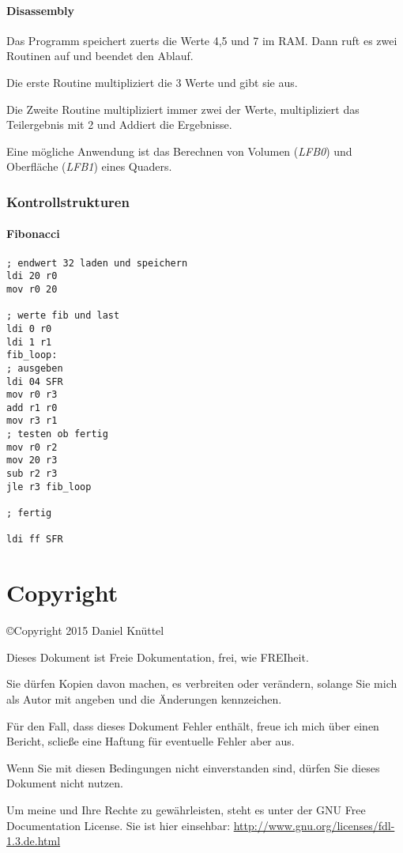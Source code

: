 \documentclass[a4paper,12pt,oneside]{scrreprt}
\begin{document}
\subsection{Disassembly}
\label{sub:disas}

Das Programm speichert zuerts die Werte 4,5 und 7 im RAM.
Dann ruft es zwei Routinen auf und beendet den Ablauf.

Die erste Routine multipliziert die 3 Werte und gibt sie aus.

Die Zweite Routine multipliziert immer zwei der Werte, multipliziert das Teilergebnis mit 2 und Addiert die Ergebnisse.

Eine mögliche Anwendung ist das Berechnen von Volumen (\textit{LFB0}) und Oberfläche (\textit{LFB1}) eines Quaders.

\section{Kontrollstrukturen}
\subsection{Fibonacci}
\label{sub:fib}

\begin{lstlisting}
; endwert 32 laden und speichern
ldi 20 r0
mov r0 20

; werte fib und last
ldi 0 r0
ldi 1 r1
fib_loop:
; ausgeben
ldi 04 SFR
mov r0 r3
add r1 r0
mov r3 r1
; testen ob fertig
mov r0 r2
mov 20 r3
sub r2 r3
jle r3 fib_loop

; fertig

ldi ff SFR

\end{lstlisting}

\part{Copyright}

\copyright Copyright 2015 Daniel Knüttel

Dieses Dokument ist Freie Dokumentation, frei, wie FREIheit.

Sie dürfen Kopien davon machen, es verbreiten oder verändern, solange Sie mich als Autor mit angeben und die Änderungen kennzeichen.

Für den Fall, dass dieses Dokument Fehler enthält, freue ich mich über einen Bericht, scließe eine Haftung für eventuelle Fehler aber aus.

Wenn Sie mit diesen Bedingungen nicht einverstanden sind, dürfen Sie dieses Dokument nicht nutzen.

Um meine und Ihre Rechte zu gewährleisten, steht es unter der GNU Free Documentation License. Sie ist hier einsehbar: \url{http://www.gnu.org/licenses/fdl-1.3.de.html}
\end{document}
